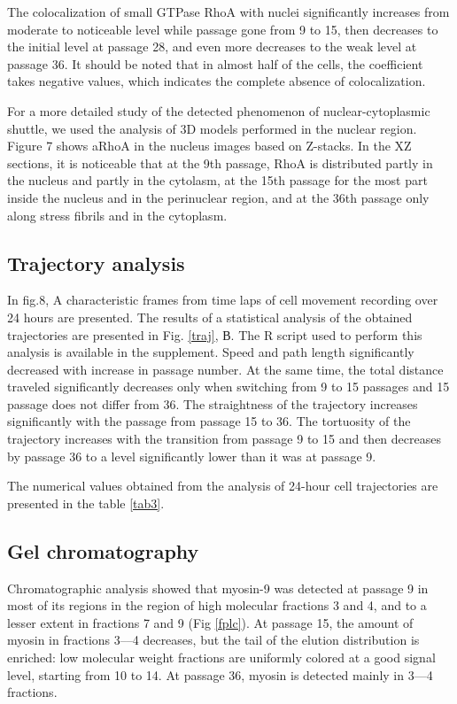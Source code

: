 \documentclass[alpha-refs]{wiley-article}
\begin{document}
The colocalization of small GTPase RhoA with nuclei significantly increases from moderate to noticeable level while passage gone from 9 to 15, then decreases to the initial level at passage 28, and even more decreases to the weak level at passage 36.
It should be noted that in almost half of the cells, the coefficient takes negative values, which indicates the complete absence of colocalization.


For a more detailed study of the detected phenomenon of nuclear-cytoplasmic shuttle, we used the analysis of 3D models performed in the nuclear region.
Figure 7 shows aRhoA in the nucleus images based on Z-stacks.
In the XZ sections, it is noticeable that at the 9th passage, RhoA is distributed partly in the nucleus and partly in the cytolasm, at the 15th passage for the most part inside the nucleus and in the perinuclear region, and at the 36th passage only along stress fibrils and in the cytoplasm.

\subsection{Trajectory analysis}


In fig.8, A characteristic frames from time laps of cell movement recording over 24 hours are presented.
The results of a statistical analysis of the obtained trajectories are presented in Fig. \ref{traj}, В.
The R script used to perform this analysis is available in the supplement.
Speed and path length significantly decreased with increase in passage number.
At the same time, the total distance traveled significantly decreases only when switching from 9 to 15 passages and 15 passage does not differ from 36.
The straightness of the trajectory increases significantly with the passage from passage 15 to 36.
The tortuosity of the trajectory increases with the transition from passage 9 to 15 and then decreases by passage 36 to a level significantly lower than it was at passage 9.


The numerical values obtained from the analysis of 24-hour cell trajectories are presented in the table \ref{tab3}.

\subsection{Gel chromatography}


Chromatographic analysis showed that myosin-9 was detected at passage 9 in most of its regions in the region of high molecular fractions 3 and 4, and to a lesser extent in fractions 7 and 9 (Fig \ref{fplc}).
At passage 15, the amount of myosin in fractions 3–--4 decreases, but the tail of the elution distribution is enriched: low molecular weight fractions are uniformly colored at a good signal level, starting from 10 to 14.
At passage 36, myosin is detected mainly in 3---4 fractions.
\end{document}
